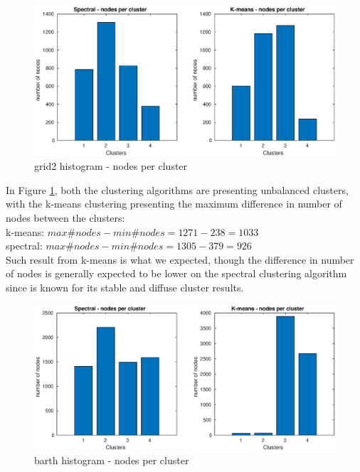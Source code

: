 \documentclass[unicode,11pt,a4paper,oneside,numbers=endperiod,openany]{scrartcl}
\begin{document}
\begin{figure}[H]
    \centering
    \caption{grid2 histogram - nodes per cluster}
    \label{fig:ex2-3-grid2}
    \includegraphics[width=\textwidth, trim={0cm 0cm 0cm 0cm}, clip]{./img/ex2-3-grid2.eps}
\end{figure}

In Figure \ref{fig:ex2-3-grid2}, both the clustering algorithms are presenting unbalanced clusters, with the  k-means clustering
presenting the maximum difference in number of nodes between the clusters: \\
k-means: $max \# nodes - min \# nodes = 1271 - 238 = 1033$\\
spectral: $max \# nodes - min \# nodes = 1305 - 379 = 926$\\
Such result from k-means is what we expected, though the difference in number of nodes is
generally expected to be lower on the spectral clustering algorithm since is known for its
stable and diffuse cluster results.

\begin{figure}[H]
    \centering
    \caption{barth histogram - nodes per cluster}
    \label{fig:ex2-3-barth}
    \includegraphics[width=\textwidth, trim={0cm 0cm 0cm 0cm}, clip]{./img/ex2-3-barth.eps}
\end{figure}
\end{document}
